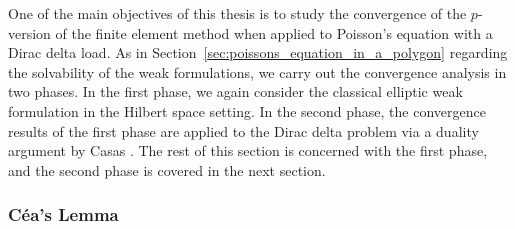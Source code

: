 \documentclass[english, 12pt, a4paper, sci, utf8, a-2b, online]{aaltothesis}
\theoremstyle{definition}
\theoremstyle{plain}
\numberwithin{equation}{section}
\begin{document}
One of the main objectives of this thesis is to study the convergence of the $p$-version
of the finite element method when applied to Poisson's equation with a Dirac delta load.
As in Section~\ref{sec:poissons_equation_in_a_polygon}
regarding the solvability of the weak formulations, we carry out the convergence
analysis in two phases. In the first phase, we again consider the classical elliptic weak
formulation in the Hilbert space setting.
In the second phase, the convergence results of the first phase
are applied to the Dirac delta problem via a duality argument by Casas \cite{casas1985}.
The rest of this section is concerned with the first phase, and
the second phase is covered in the next section.

\subsubsection{Céa's Lemma}
\label{subsubsec:ceas_lemma}
\end{document}
